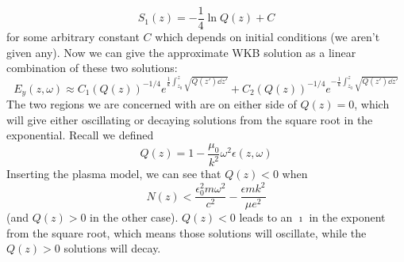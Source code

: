 \documentclass[a4paper,twoside]{article}
\begin{document}
\begin{itemize}
\begin{problem}
\begin{equation}
                S_1(z) = - \frac{1}{4} \ln{Q(z)} + C
            \end{equation}
            for some arbitrary constant $ C $ which depends on initial conditions (we aren't given any). Now we can give the approximate WKB solution as a linear combination of these two solutions:
            \begin{equation}
                E_y(z, \omega) \approx C_1 (Q(z))^{-1/4} e^{\frac{1}{k} \int_{z_0}^{z}\sqrt{Q(z') \dd{z'} }} + C_2 (Q(z))^{-1/4} e^{-\frac{1}{k} \int_{z_0}^{z}\sqrt{Q(z') \dd{z'} }}
            \end{equation}
            The two regions we are concerned with are on either side of $ Q(z) = 0 $, which will give either oscillating or decaying solutions from the square root in the exponential. Recall we defined
            \begin{equation}
                Q(z) = 1 - \frac{\mu_0}{k^2} \omega^2 \epsilon(z, \omega)
            \end{equation}
            Inserting the plasma model, we can see that $ Q(z) < 0 $ when
            \begin{equation}
                N(z) < \frac{\epsilon_0^2 m \omega^2}{c^2} - \frac{\epsilon m k^2}{\mu e^2}
            \end{equation}
            (and $ Q(z) > 0 $ in the other case). $ Q(z) < 0 $ leads to an $ \imath $ in the exponent from the square root, which means those solutions will oscillate, while the $ Q(z) > 0 $ solutions will decay.
        \end{problem}
\end{itemize}
\end{document}
